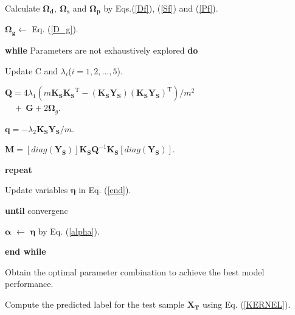 \documentclass[a4paper]{cas-sc}
\begin{document}
\begin{algorithm}
\caption{CDLDM}
\label{alg}

Calculate $\boldsymbol{\Omega_d},\ \boldsymbol{\Omega_s}$ and $\boldsymbol{\Omega_p}$ by Eqs.(\ref{Df}), (\ref{Sf}) and (\ref{Pf}).

$\boldsymbol{\Omega_g} \leftarrow$ Eq. (\ref{D_g}).

\textbf{while} Parameters are not exhaustively explored \textbf{do}

\quad Update C and ${\lambda _i}$($i = 1, 2, \ldots ,5$).    


\quad ${\boldsymbol{Q}  = 4}{\lambda _1}(m \boldsymbol{K_S} {\boldsymbol{K_S}^{\mathrm{T}}} - (\boldsymbol{K_S} \boldsymbol{Y_S}){(\boldsymbol{K_S} \boldsymbol{Y_S})^{\mathrm{T}}})/{m^2} $\\ 
\qquad $\quad+\ \boldsymbol{G} + 2 \boldsymbol{\Omega}_{g}$.

\quad $\boldsymbol{q}= - {\lambda _2}\boldsymbol{K_S} \boldsymbol{Y_S}/m$.

\quad $\boldsymbol{M}=[diag(\boldsymbol{Y_S})] \boldsymbol{K_S} {\boldsymbol{Q}^{ - 1}}\boldsymbol{K_S}[diag(\boldsymbol{Y_S})]$.

\quad \textbf{repeat}

\quad\quad Update variables $\boldsymbol{\eta}$ in Eq. (\ref{end}).

\quad \textbf{until} convergenc

\quad $\boldsymbol{\alpha}$ $\leftarrow$  $\boldsymbol{\eta}$ by Eq. (\ref{alpha}).


\textbf{end while}

Obtain the optimal parameter combination to achieve the best model performance.

Compute the predicted label for the test sample $\boldsymbol{{X_T}}$ using Eq. (\ref{KERNEL}).
\end{algorithm}

\end{document}
